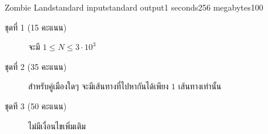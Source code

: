 \documentclass[11pt,a4paper]{article}
\begin{document}
\begin{problem}{Zombie Land}{standard input}{standard output}{1 seconds}{256 megabytes}{100}
\begin{description}

\item[ชุดที่ 1 (15 คะแนน)] จะมี $ 1 \leq N \leq 3 \cdot 10^3 $

\item[ชุดที่ 2 (35 คะแนน)] สำหรับคู่เมืองใดๆ จะมีเส้นทางที่ไปหากันได้เพียง $1$ เส้นทางเท่านั้น

\item[ชุดที 3 (50 คะแนน)] ไม่มีเงื่อนไขเพิ่มเติม

\end{description}

\Examples

\begin{example}
%
\end{example}

\end{problem}
\end{document}
